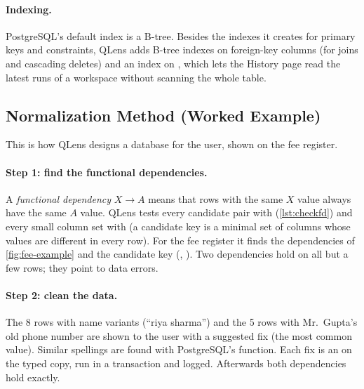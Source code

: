 \paragraph{Indexing.} PostgreSQL's default index is a B-tree. Besides the indexes it creates for primary
keys and  constraints, QLens adds B-tree indexes on foreign-key columns (for joins and
cascading deletes) and an index on , which lets the
History page read the latest runs of a workspace without scanning the whole table.

\subsection{Normalization Method (Worked Example)}
\label{sec:design-3nf}

This is how QLens designs a database for the user, shown on the fee register.


\paragraph{Step 1: find the functional dependencies.} A \emph{functional dependency} $X \rightarrow A$
means that rows with the same $X$ value always have the same $A$ value. QLens tests every candidate pair
with  (\cref{lst:checkfd}) and every small column set with  (a candidate
key is a minimal set of columns whose values are different in every row). For the fee register it finds
the dependencies of \cref{fig:fee-example} and the candidate key (, ).
Two dependencies hold on all but a few rows; they point to data errors.


\paragraph{Step 2: clean the data.} The 8 rows with name variants (``riya sharma'') and the 5 rows with
Mr.\ Gupta's old phone number are shown to the user with a suggested fix (the most common value). Similar
spellings are found with PostgreSQL's  function. Each fix is an  on the
typed copy, run in a transaction and logged. Afterwards both dependencies hold exactly.

